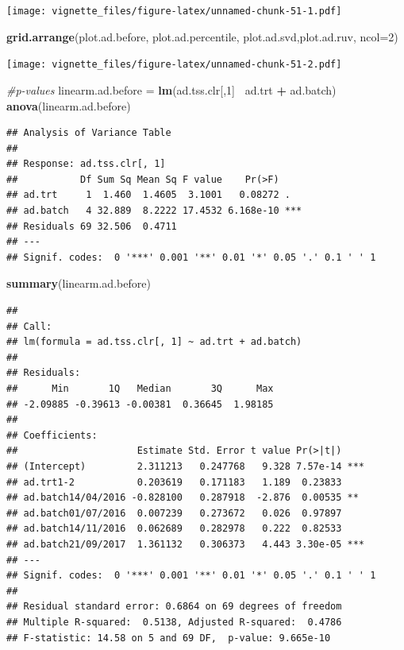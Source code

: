 \documentclass[]{book}
\newenvironment{Shaded}{\begin{snugshade}}{\end{snugshade}}
\newcommand{\KeywordTok}[1]{\textcolor[rgb]{0.13,0.29,0.53}{\textbf{#1}}}
\newcommand{\DataTypeTok}[1]{\textcolor[rgb]{0.13,0.29,0.53}{#1}}
\newcommand{\DecValTok}[1]{\textcolor[rgb]{0.00,0.00,0.81}{#1}}
\newcommand{\StringTok}[1]{\textcolor[rgb]{0.31,0.60,0.02}{#1}}
\newcommand{\CommentTok}[1]{\textcolor[rgb]{0.56,0.35,0.01}{\textit{#1}}}
\newcommand{\OperatorTok}[1]{\textcolor[rgb]{0.81,0.36,0.00}{\textbf{#1}}}
\newcommand{\NormalTok}[1]{#1}
\begin{document}
\texttt{[image: vignette\_files/figure-latex/unnamed-chunk-51-1.pdf]}

\begin{Shaded}
\begin{Highlighting}[]
\KeywordTok{grid.arrange}\NormalTok{(plot.ad.before, plot.ad.percentile, plot.ad.svd,plot.ad.ruv, }\DataTypeTok{ncol=}\DecValTok{2}\NormalTok{)}
\end{Highlighting}
\end{Shaded}

\texttt{[image: vignette\_files/figure-latex/unnamed-chunk-51-2.pdf]}

\begin{Shaded}
\begin{Highlighting}[]
\CommentTok{#p-values}
\NormalTok{linearm.ad.before =}\StringTok{ }\KeywordTok{lm}\NormalTok{(ad.tss.clr[,}\DecValTok{1}\NormalTok{]}\OperatorTok{~}\StringTok{ }\NormalTok{ad.trt }\OperatorTok{+}\StringTok{ }\NormalTok{ad.batch)}
\KeywordTok{anova}\NormalTok{(linearm.ad.before)}
\end{Highlighting}
\end{Shaded}

\begin{verbatim}
## Analysis of Variance Table
## 
## Response: ad.tss.clr[, 1]
##           Df Sum Sq Mean Sq F value    Pr(>F)    
## ad.trt     1  1.460  1.4605  3.1001   0.08272 .  
## ad.batch   4 32.889  8.2222 17.4532 6.168e-10 ***
## Residuals 69 32.506  0.4711                      
## ---
## Signif. codes:  0 '***' 0.001 '**' 0.01 '*' 0.05 '.' 0.1 ' ' 1
\end{verbatim}

\begin{Shaded}
\begin{Highlighting}[]
\KeywordTok{summary}\NormalTok{(linearm.ad.before)}
\end{Highlighting}
\end{Shaded}

\begin{verbatim}
## 
## Call:
## lm(formula = ad.tss.clr[, 1] ~ ad.trt + ad.batch)
## 
## Residuals:
##      Min       1Q   Median       3Q      Max 
## -2.09885 -0.39613 -0.00381  0.36645  1.98185 
## 
## Coefficients:
##                     Estimate Std. Error t value Pr(>|t|)    
## (Intercept)         2.311213   0.247768   9.328 7.57e-14 ***
## ad.trt1-2           0.203619   0.171183   1.189  0.23833    
## ad.batch14/04/2016 -0.828100   0.287918  -2.876  0.00535 ** 
## ad.batch01/07/2016  0.007239   0.273672   0.026  0.97897    
## ad.batch14/11/2016  0.062689   0.282978   0.222  0.82533    
## ad.batch21/09/2017  1.361132   0.306373   4.443 3.30e-05 ***
## ---
## Signif. codes:  0 '***' 0.001 '**' 0.01 '*' 0.05 '.' 0.1 ' ' 1
## 
## Residual standard error: 0.6864 on 69 degrees of freedom
## Multiple R-squared:  0.5138, Adjusted R-squared:  0.4786 
## F-statistic: 14.58 on 5 and 69 DF,  p-value: 9.665e-10
\end{verbatim}
\end{document}
